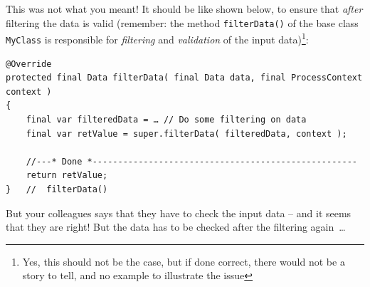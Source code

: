 \documentclass[11pt,a4paper, titlepage, parskip=half, headsepline, footsepline, cleardoublepage=current, headheight=1cm]{scrbook}
\begin{document}
This was not what you meant! It should be like shown below, to ensure that \textit{after} filtering the data is valid (remember: the method \lstinline|filterData()| of the base class \lstinline|MyClass| is responsible for \textit{filtering} and \textit{validation} of the input data)\footnote{Yes, this should not be the case, but if done correct, there would not be a story to tell, and no example to illustrate the issue}:
\begin{lstlisting}
@Override
protected final Data filterData( final Data data, final ProcessContext context )
{
    final var filteredData = … // Do some filtering on data
    final var retValue = super.filterData( filteredData, context );
        
    //---* Done *----------------------------------------------------
    return retValue;
}   //  filterData()
\end{lstlisting}

But your colleagues says that they have to check the input data – and it seems that they are right! But the data has to be checked after the filtering again~…
\end{document}

